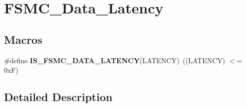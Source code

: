 \hypertarget{group___f_s_m_c___data___latency}{\section{F\-S\-M\-C\-\_\-\-Data\-\_\-\-Latency}
\label{group___f_s_m_c___data___latency}
}
\subsection*{Macros}
\begin{DoxyCompactItemize}
\item 
\hypertarget{group___f_s_m_c___data___latency_ga1ab8659a9631d8bb4f57d8be8580155c}{\#define {\bfseries I\-S\-\_\-\-F\-S\-M\-C\-\_\-\-D\-A\-T\-A\-\_\-\-L\-A\-T\-E\-N\-C\-Y}(L\-A\-T\-E\-N\-C\-Y)~((L\-A\-T\-E\-N\-C\-Y) $<$= 0x\-F)}\label{group___f_s_m_c___data___latency_ga1ab8659a9631d8bb4f57d8be8580155c}

\end{DoxyCompactItemize}


\subsection{Detailed Description}
